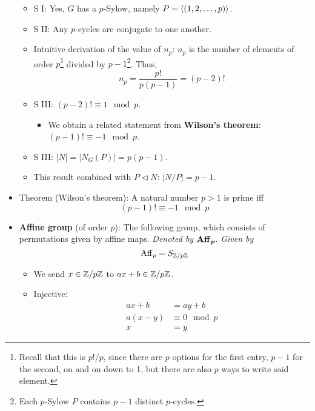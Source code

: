 \documentclass[../notes.tex]{subfiles}
\begin{document}
\begin{itemize}
    \begin{itemize}
        \item S I: Yes, $G$ has a $p$-Sylow, namely $P=\left\langle{(1,2,\dots,p)}\right\rangle$.
        \item S II: Any $p$-cycles are conjugate to one another.
        \item Intuitive derivation of the value of $n_p$: $n_p$ is the number of elements of order $p$\footnote{Recall that this is $p!/p$, since there are $p$ options for the first entry, $p-1$ for the second, on and on down to 1, but there are also $p$ ways to write said element.} divided by $p-1$\footnote{Each $p$-Sylow $P$ contains $p-1$ distinct $p$-cycles.}. Thus,
        \begin{equation*}
            n_p = \frac{p!}{p(p-1)}
            = (p-2)!
        \end{equation*}
        \item S III: $(p-2)!\equiv 1\mod p$.
        \begin{itemize}
            \item We obtain a related statement from \textbf{Wilson's theorem}: $(p-1)!\equiv -1\mod p$.
        \end{itemize}
        \item S III: $|N|=|N_G(P)|=p(p-1)$.
        \item This result combined with $P\triangleleft N$: $|N/P|=p-1$.
    \end{itemize}
    \item Theorem (Wilson's theorem): A natural number $p>1$ is prime iff
    \begin{equation*}
        (p-1)! \equiv -1\mod p
    \end{equation*}
    \item \textbf{Affine group} (of order $p$): The following group, which consists of permutations given by affine maps. \emph{Denoted by} $\bm{\Aff_p}$. \emph{Given by}
    \begin{equation*}
        \operatorname{Aff}_p = S_{\mathbb{Z}/p\mathbb{Z}}
    \end{equation*}
    \begin{itemize}
        \item We send $x\in\mathbb{Z}/p\mathbb{Z}$ to $ax+b\in\mathbb{Z}/p\mathbb{Z}$.
        \item Injective:
        \begin{align*}
            ax+b &= ay+b\\
            a(x-y) &\equiv 0\mod p\\
            x &= y
        \end{align*}

\end{itemize}
\end{itemize}
\end{document}
